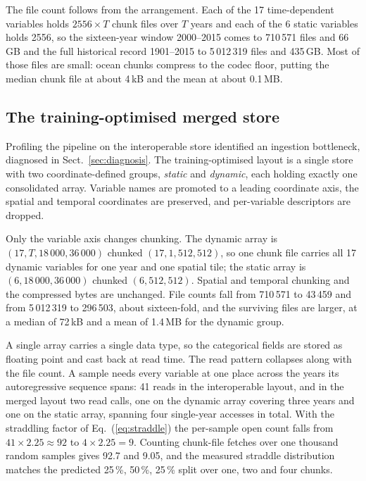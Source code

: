 \documentclass[gmd, manuscript]{copernicus}
\begin{document}
The file count follows from the arrangement. Each of the 17 time-dependent variables holds
$2556 \times T$ chunk files over $T$ years and each of the 6 static variables holds 2556, so
the sixteen-year window 2000--2015 comes to 710\,571 files and 66\,GB and the full historical
record 1901--2015 to 5\,012\,319 files and 435\,GB. Most of those files are small: ocean chunks
compress to the codec floor, putting the median chunk file at about 4\,kB and the mean at about
0.1\,MB.

\subsection{The training-optimised merged store}
\label{sec:merged-store}

Profiling the pipeline on the interoperable store identified an ingestion bottleneck, diagnosed
in Sect.~\ref{sec:diagnosis}. The training-optimised layout is a single store with two
coordinate-defined groups, \emph{static} and \emph{dynamic}, each holding exactly one
consolidated array. Variable names are promoted to a leading coordinate axis, the spatial and
temporal coordinates are preserved, and per-variable descriptors are dropped.

Only the variable axis changes chunking. The dynamic array is
$(17, T, 18\,000, 36\,000)$ chunked $(17, 1, 512, 512)$, so one chunk file carries all 17
dynamic variables for one year and one spatial tile; the static array is
$(6, 18\,000, 36\,000)$ chunked $(6, 512, 512)$. Spatial and temporal chunking and the
compressed bytes are unchanged. File counts fall from 710\,571 to 43\,459 and from
5\,012\,319 to 296\,503, about sixteen-fold, and the surviving files are larger, at a median of
72\,kB and a mean of 1.4\,MB for the dynamic group.

A single array carries a single data type, so the categorical fields are stored as floating
point and cast back at read time. The read pattern collapses along with the file count. A
sample needs every variable at one place across the years its autoregressive sequence spans:
41 reads in the interoperable layout, and in the merged layout two read calls, one on the
dynamic array covering three years and one on the static array, spanning four single-year
accesses in total. With the straddling factor of Eq.~(\ref{eq:straddle}) the per-sample open
count falls from $41 \times 2.25 \approx 92$ to $4 \times 2.25 = 9$. Counting chunk-file
fetches over one thousand random samples gives 92.7 and 9.05, and the measured straddle
distribution matches the predicted 25\,\%, 50\,\%, 25\,\% split over one, two and four chunks.
\end{document}
